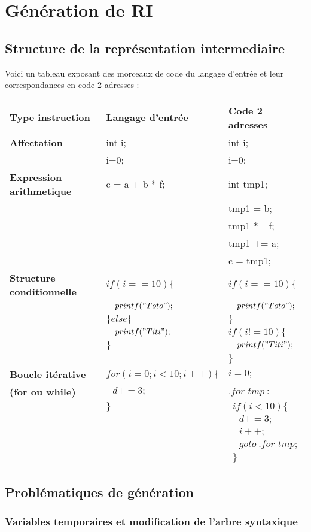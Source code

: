\newpage
\section{Génération de RI}
\subsection{Structure de la représentation intermediaire}

Voici un tableau exposant des morceaux de code du langage d'entrée et leur correspondances en code 2 adresses : \\

\begin{tabular}{|l|l|l|}
  \hline
  \textbf{Type instruction} & \textbf{Langage d'entrée} & \textbf{Code 2 adresses} \\
  \hline
  \textbf{Affectation} & int i; & int i; \tabularnewline
    & i=0; & i=0; \tabularnewline
  \hline
  \textbf{Expression arithmetique} & c = a + b * f; & int tmp1; \tabularnewline
   & & tmp1 = b; \tabularnewline
   & & tmp1 *= f; \tabularnewline
   & & tmp1 += a; \tabularnewline
   & & c = tmp1; \tabularnewline
  \hline
  \textbf{Structure conditionnelle} & \raggedleft $if(i==10)\{$ & $if(i==10)\{$ \tabularnewline
  & $\ \ \ printf("Toto");$ & \raggedleft $\ \ \ printf("Toto");$ \tabularnewline
  & $\} else \{$ & \raggedleft $\}$ \tabularnewline
  & $\ \ \ printf("Titi");$ & \raggedleft $if(i!=10)\{$ \tabularnewline
  & $\} $ & \raggedleft $\ \ \ printf("Titi");$ \tabularnewline
  & & \raggedleft $\}$ \tabularnewline
  \hline
  \textbf{Boucle itérative} & \raggedleft $for(i=0; i<10; i++)\{$ & $i = 0;$ \tabularnewline
  \textbf{(for ou while)} & $\ \ \ d += 3;$ & \raggedleft $.for\_tmp\ :$ \tabularnewline
  & $\}$ & \raggedleft $\ \ if(i<10)\{$ \tabularnewline
  & & \raggedleft $\ \ \ \ \ d += 3;$ \tabularnewline
  & & \raggedleft $\ \ \ \ \ i++;$ \tabularnewline
  & & \raggedleft $\ \ \ \ \ goto\ .for\_tmp;$  \tabularnewline
  & & \raggedleft $\ \ \}$ \tabularnewline
  \hline
\end{tabular}

\subsection{Problématiques de génération}
\subsubsection{Variables temporaires et modification de l'arbre syntaxique}

